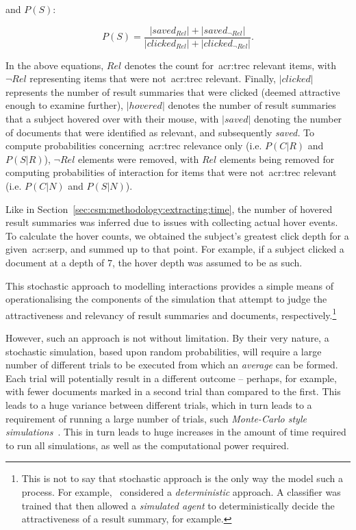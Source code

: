 and $P(S)$:

\begin{equation*}
    P(S) = \frac{|saved_{Rel}| + | saved_{\neg Rel} |}{|clicked_{Rel}| + |clicked_{\neg Rel}|}.
\end{equation*}

In the above equations, $Rel$ denotes the count for~\gls{acr:trec} relevant items, with $\neg Rel$ representing items that were not~\gls{acr:trec} relevant. Finally, $|clicked|$ represents the number of result summaries that were clicked (deemed attractive enough to examine further), $|hovered|$ denotes the number of result summaries that a subject hovered over with their mouse, with $|saved|$ denoting the number of documents that were identified as relevant, and subsequently \emph{saved.} To compute probabilities concerning~\gls{acr:trec} relevance only (i.e. $P(C|R)$ and $P(S|R)$), $\neg Rel$ elements were removed, with $Rel$ elements being removed for computing probabilities of interaction for items that were not~\gls{acr:trec} relevant (i.e. $P(C|N)$ and $P(S|N)$).

Like in Section~\ref{sec:csm:methodology:extracting:time}, the number of hovered result summaries was inferred due to issues with collecting actual hover events. To calculate the hover counts, we obtained the subject's greatest click depth for a given~\gls{acr:serp}, and summed up to that point. For example, if a subject clicked a document at a depth of $7$, the hover depth was assumed to be as such.

This stochastic approach to modelling interactions provides a simple means of operationalising the components of the simulation that attempt to judge the attractiveness and relevancy of result summaries and documents, respectively.\footnote{This is not to say that stochastic approach is the only way the model such a process. For example,~\cite{maxwell2016agents} considered a \emph{deterministic} approach. A classifier was trained that then allowed a \emph{simulated agent} to deterministically decide the attractiveness of a result summary, for example.}

However, such an approach is not without limitation. By their very nature, a stochastic simulation, based upon random probabilities, will require a large number of different trials to be executed from which an \emph{average} can be formed. Each trial will potentially result in a different outcome -- perhaps, for example, with fewer documents marked in a second trial than compared to the first. This leads to a huge variance between different trials, which in turn leads to a requirement of running a large number of trials, such \emph{Monte-Carlo style simulations}~\citep{benov2016manhattan}. This in turn leads to huge increases in the amount of time required to run all simulations, as well as the computational power required.


